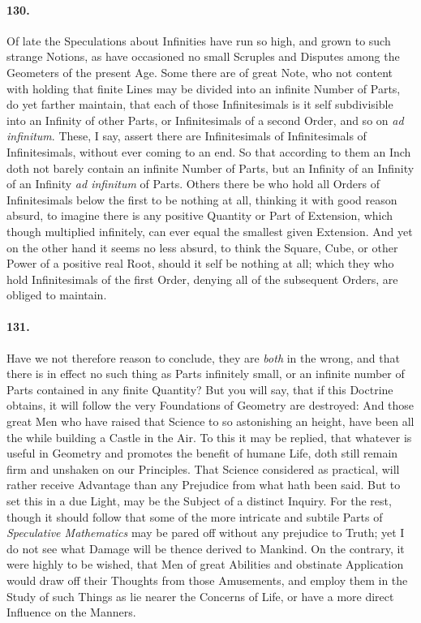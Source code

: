 \documentclass[]{article}
\newenvironment{sectionbody}{\begin{multicols}{2}}{\end{multicols}}
\begin{document}
\begin{sectionbody}
\paragraph{130.} Of late the Speculations about Infinities have run so high, and
grown to such strange Notions, as have occasioned no small
Scruples and Disputes among the Geometers of the present Age.
Some there are of great Note, who not content with holding that
finite Lines may be divided into an infinite Number of Parts, do
yet farther maintain, that each of those Infinitesimals is it
self subdivisible into an Infinity of other Parts, or
Infinitesimals of a second Order, and so on \emph{ad
infinitum}.  These, I say, assert there are Infinitesimals of
Infinitesimals of Infinitesimals, without ever coming to an end.
So that according to them an Inch doth not barely contain an
infinite Number of Parts, but an Infinity of an Infinity of an
Infinity \emph{ad infinitum} of Parts.  Others there be who
hold all Orders of Infinitesimals below the first to be nothing
at all, thinking it with good reason absurd, to imagine there is
any positive Quantity or Part of Extension, which though
multiplied infinitely, can ever equal the smallest given
Extension.  And yet on the other hand it seems no less absurd, to
think the Square, Cube, or other Power of a positive real Root,
should it self be nothing at all; which they who hold
Infinitesimals of the first Order, denying all of the subsequent
Orders, are obliged to maintain.



\paragraph{131.} Have we not therefore reason to conclude, they are \emph{both}
in the wrong, and that there is in effect no such thing as Parts
infinitely small, or an infinite number of Parts contained in any
finite Quantity?  But you will say, that if this Doctrine
obtains, it will follow the very Foundations of Geometry are
destroyed: And those great Men who have raised that Science to so
astonishing an height, have been all the while building a Castle
in the Air.  To this it may be replied, that whatever is useful
in Geometry and promotes the benefit of humane Life, doth still
remain firm and unshaken on our Principles.  That Science
considered as practical, will rather receive Advantage than any
Prejudice from what hath been said.  But to set this in a due
Light, may be the Subject of a distinct Inquiry.  For the rest,
though it should follow that some of the more intricate and
subtile Parts of \emph{Speculative Mathematics} may be pared
off without any prejudice to Truth; yet I do not see what Damage
will be thence derived to Mankind.  On the contrary, it were
highly to be wished, that Men of great Abilities and obstinate
Application would draw off their Thoughts from those Amusements,
and employ them in the Study of such Things as lie nearer the
Concerns of Life, or have a more direct Influence on the Manners.




\end{sectionbody}
\end{document}
